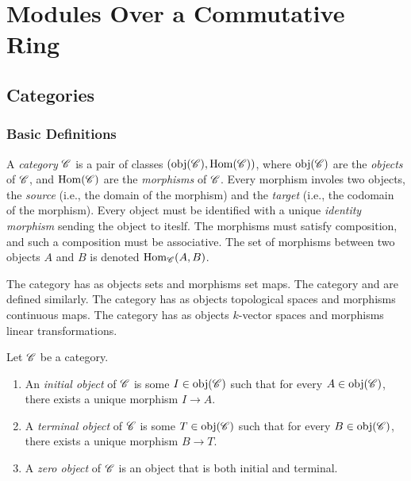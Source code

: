 
\chapter{Modules Over a Commutative Ring}

\section{Categories}

\subsection{Basic Definitions}

\begin{definition}
	A \emph{category} $\mathscr{C}$ is a pair of classes $(\operatorname{obj}(\mathscr{C}), \operatorname{Hom}(\mathscr{C}))$, where $\operatorname{obj}(\mathscr{C})$ are the \emph{objects} of $\mathscr{C}$, and $\operatorname{Hom}(\mathscr{C})$ are the \emph{morphisms} of $\mathscr{C}$. Every morphism involes two objects, the \emph{source} (i.e., the domain of the morphism) and the \emph{target} (i.e., the codomain of the morphism). Every object must be identified with a unique \emph{identity morphism} sending the object to iteslf. The morphisms must satisfy composition, and such a composition must be associative. The set of morphisms between two objects $A$ and $B$ is denoted $\operatorname{Hom}_{\mathscr{C}}(A,B)$.
\end{definition}

\begin{example}
	The category  has as objects sets and morphisms set maps. The category  and  are defined similarly. The category  has as objects topological spaces and morphisms continuous maps. The category  has as objects $k$-vector spaces and morphisms linear transformations.
\end{example}

\begin{definition}
	Let $\mathscr{C}$ be a category.
	\mbox{}
	\begin{enumerate}[label = (\arabic*),itemsep=1pt,topsep=3pt]
		\item An \emph{initial object} of $\mathscr{C}$ is some $I \in \operatorname{obj}(\mathscr{C})$ such that for every $A \in \operatorname{obj}(\mathscr{C})$, there exists a unique morphism $I \rightarrow A$.
		\item A \emph{terminal object} of $\mathscr{C}$ is some $T \in \operatorname{obj}(\mathscr{C})$ such that for every $B \in \operatorname{obj}(\mathscr{C})$, there exists a unique morphism $B \rightarrow T$.
		\item A \emph{zero object} of $\mathscr{C}$ is an object that is both initial and terminal.
	\end{enumerate}
\end{definition}


